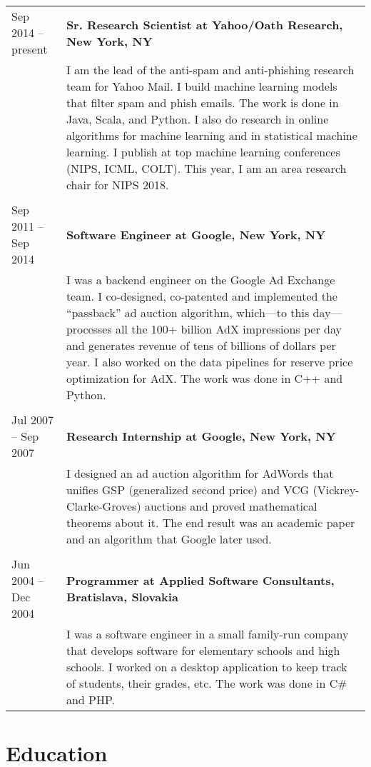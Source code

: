 \documentclass[9pt]{article}
\newcommand{\smallfont}{\small}
\begin{document}
\begin{longtable}{@{}lp{13cm}}
Sep 2014 -- present & \textbf{Sr. Research Scientist at Yahoo/Oath Research, New York, NY} \\
& {\smallfont I am the lead of the anti-spam and anti-phishing research team for
Yahoo Mail. I build machine learning models that filter spam and phish emails.
The work is done in Java, Scala, and Python. I also do research in online
algorithms for machine learning and in statistical machine learning. I publish
at top machine learning conferences (NIPS, ICML, COLT). This year, I am an area
research chair for NIPS 2018.} \\
\\
Sep 2011 -- Sep 2014 & \textbf{Software Engineer at Google, New York, NY} \\
& {\smallfont I was a backend engineer on the Google Ad Exchange team. I
co-designed, co-patented and implemented the ``passback'' ad auction algorithm,
which---to this day---processes all the 100+ billion AdX impressions per day and
generates revenue of tens of billions of dollars per year. I also worked on the
data pipelines for reserve price optimization for AdX. The work was done in C++
and Python.} \\
\\
Jul 2007 -- Sep 2007 & \textbf{Research Internship at Google, New York, NY} \\
& {\smallfont I designed an ad auction algorithm for AdWords that unifies GSP
(generalized second price) and VCG (Vickrey-Clarke-Groves) auctions and proved
mathematical theorems about it. The end result was an academic paper and an
algorithm that Google later used.} \\
\\
Jun 2004 -- Dec 2004 & \textbf{Programmer at Applied Software Consultants, Bratislava, Slovakia} \\
& {\smallfont I was a software engineer in a small family-run company that
develops software for elementary schools and high schools. I worked on a desktop
application to keep track of students, their grades, etc. The work was done in
C\# and PHP.} \\
\end{longtable}

\clearpage

\section*{Education}
\end{document}
